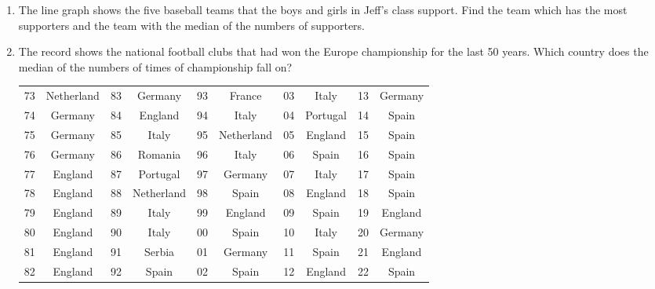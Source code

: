 \documentclass[11pt]{scrartcl}
\begin{document}
\begin{enumerate}[resume]
     \vspace{7.5cm} \item The line graph shows the five baseball teams that the boys and girls in Jeff's class support. Find the team which has the most supporters and the team with the median of the numbers of supporters.
    
        \begin{center}
        \end{center}

    \vspace{7.5cm} \item The record shows the national football clubs that had won the Europe championship for the last 50 years. Which country does the median of the numbers of times of championship fall on?
    \vspace{\baselineskip}
    \begin{tabular}{cc|cc|cc|cc|cc}
        \hline\hline
        73 & Netherland & 83 & Germany & 93 & France & 03 & Italy & 13 & Germany\\
        74 & Germany & 84 & England & 94 & Italy & 04 & Portugal & 14 & Spain\\
        75 & Germany & 85 & Italy & 95 & Netherland & 05 & England & 15 & Spain\\
        76 & Germany & 86 & Romania & 96 & Italy & 06 & Spain & 16 & Spain\\
        77 & England & 87 & Portugal & 97 & Germany & 07 & Italy & 17 & Spain\\
        78 & England & 88 & Netherland & 98 & Spain & 08 & England & 18 & Spain\\
        79 & England & 89 & Italy & 99 & England & 09 & Spain & 19 & England\\
        80 & England & 90 & Italy & 00 & Spain & 10 & Italy & 20 & Germany\\
        81 & England & 91 & Serbia & 01 & Germany & 11 & Spain & 21 & England\\
        82 & England & 92 & Spain & 02 & Spain & 12 & England & 22 & Spain\\
    \hline\hline
    \end{tabular}


\end{enumerate}
\end{document}
